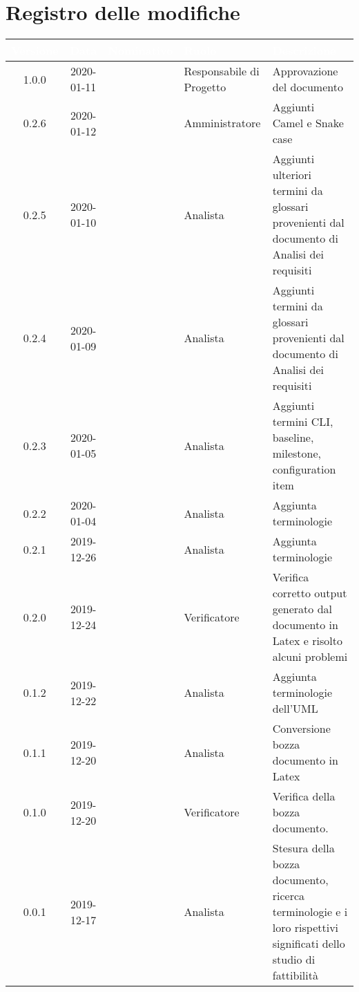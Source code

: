 \section*{Registro delle modifiche}
{
\renewcommand{\arraystretch}{1.5}
\centering
\begin{longtable}{ c c  C{4cm}  C{3cm} C{4cm}}
\textcolor{white}{\textbf{Versione}} & \textcolor{white}{\textbf{Data}} & \textcolor{white}{\textbf{Nominativo}} & \textcolor{white}{\textbf{Ruolo}} & \textcolor{white}{\textbf{Descrizione}}\\	
\endhead


1.0.0 & 2020-01-11 & \SE{} & Responsabile di Progetto & Approvazione del documento \\

0.2.6 & 2020-01-12 & \AT{} & Amministratore & Aggiunti Camel e Snake case \\

0.2.5 & 2020-01-10 & \PF{} & Analista & Aggiunti ulteriori termini da glossari provenienti dal documento di Analisi dei requisiti \\

0.2.4 & 2020-01-09 & \PF{} & Analista & Aggiunti termini da glossari provenienti dal documento di Analisi dei requisiti \\

0.2.3 & 2020-01-05 & \AT{} & Analista & Aggiunti termini CLI, baseline, milestone, configuration item \\

0.2.2 & 2020-01-04 & \MC{} & Analista & Aggiunta terminologie \\

0.2.1 & 2019-12-26 & \MC{} & Analista & Aggiunta terminologie \\

0.2.0 & 2019-12-24 & \DF{} & Verificatore & Verifica corretto output generato dal documento in Latex e risolto alcuni problemi\\

0.1.2 & 2019-12-22 & \CE{} & Analista & Aggiunta terminologie dell'UML \\

0.1.1 & 2019-12-20 & \MC{} & Analista & Conversione bozza documento in Latex\\
		
0.1.0 & 2019-12-20 & \DF{} & Verificatore & Verifica della bozza documento.  \\
		
0.0.1 & 2019-12-17 & \MC{} & Analista & Stesura della bozza documento, ricerca terminologie e i loro rispettivi significati dello studio di fattibilità \\
		
\end{longtable}
}